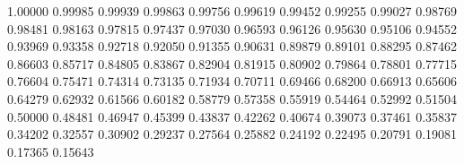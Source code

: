 	
\def\pgfmath@def#1#2#3{\expandafter\def\csname pgfmath@#1@#2\endcsname{#3}}
\pgfmath@def{cos}{0}{1.00000}		\pgfmath@def{cos}{1}{0.99985}
\pgfmath@def{cos}{2}{0.99939}		\pgfmath@def{cos}{3}{0.99863}
\pgfmath@def{cos}{4}{0.99756}		\pgfmath@def{cos}{5}{0.99619}
\pgfmath@def{cos}{6}{0.99452}		\pgfmath@def{cos}{7}{0.99255}
\pgfmath@def{cos}{8}{0.99027}		\pgfmath@def{cos}{9}{0.98769}
\pgfmath@def{cos}{10}{0.98481}		\pgfmath@def{cos}{11}{0.98163}
\pgfmath@def{cos}{12}{0.97815}		\pgfmath@def{cos}{13}{0.97437}
\pgfmath@def{cos}{14}{0.97030}		\pgfmath@def{cos}{15}{0.96593}
\pgfmath@def{cos}{16}{0.96126}		\pgfmath@def{cos}{17}{0.95630}
\pgfmath@def{cos}{18}{0.95106}		\pgfmath@def{cos}{19}{0.94552}
\pgfmath@def{cos}{20}{0.93969}		\pgfmath@def{cos}{21}{0.93358}
\pgfmath@def{cos}{22}{0.92718}		\pgfmath@def{cos}{23}{0.92050}
\pgfmath@def{cos}{24}{0.91355}		\pgfmath@def{cos}{25}{0.90631}
\pgfmath@def{cos}{26}{0.89879}		\pgfmath@def{cos}{27}{0.89101}
\pgfmath@def{cos}{28}{0.88295}		\pgfmath@def{cos}{29}{0.87462}
\pgfmath@def{cos}{30}{0.86603}		\pgfmath@def{cos}{31}{0.85717}
\pgfmath@def{cos}{32}{0.84805}		\pgfmath@def{cos}{33}{0.83867}
\pgfmath@def{cos}{34}{0.82904}		\pgfmath@def{cos}{35}{0.81915}
\pgfmath@def{cos}{36}{0.80902}		\pgfmath@def{cos}{37}{0.79864}
\pgfmath@def{cos}{38}{0.78801}		\pgfmath@def{cos}{39}{0.77715}
\pgfmath@def{cos}{40}{0.76604}		\pgfmath@def{cos}{41}{0.75471}
\pgfmath@def{cos}{42}{0.74314}		\pgfmath@def{cos}{43}{0.73135}
\pgfmath@def{cos}{44}{0.71934}		\pgfmath@def{cos}{45}{0.70711}
\pgfmath@def{cos}{46}{0.69466}		\pgfmath@def{cos}{47}{0.68200}
\pgfmath@def{cos}{48}{0.66913}		\pgfmath@def{cos}{49}{0.65606}
\pgfmath@def{cos}{50}{0.64279}		\pgfmath@def{cos}{51}{0.62932}
\pgfmath@def{cos}{52}{0.61566}		\pgfmath@def{cos}{53}{0.60182}
\pgfmath@def{cos}{54}{0.58779}		\pgfmath@def{cos}{55}{0.57358}
\pgfmath@def{cos}{56}{0.55919}		\pgfmath@def{cos}{57}{0.54464}
\pgfmath@def{cos}{58}{0.52992}		\pgfmath@def{cos}{59}{0.51504}
\pgfmath@def{cos}{60}{0.50000}		\pgfmath@def{cos}{61}{0.48481}
\pgfmath@def{cos}{62}{0.46947}		\pgfmath@def{cos}{63}{0.45399}
\pgfmath@def{cos}{64}{0.43837}		\pgfmath@def{cos}{65}{0.42262}
\pgfmath@def{cos}{66}{0.40674}		\pgfmath@def{cos}{67}{0.39073}
\pgfmath@def{cos}{68}{0.37461}		\pgfmath@def{cos}{69}{0.35837}
\pgfmath@def{cos}{70}{0.34202}		\pgfmath@def{cos}{71}{0.32557}
\pgfmath@def{cos}{72}{0.30902}		\pgfmath@def{cos}{73}{0.29237}
\pgfmath@def{cos}{74}{0.27564}		\pgfmath@def{cos}{75}{0.25882}
\pgfmath@def{cos}{76}{0.24192}		\pgfmath@def{cos}{77}{0.22495}
\pgfmath@def{cos}{78}{0.20791}		\pgfmath@def{cos}{79}{0.19081}
\pgfmath@def{cos}{80}{0.17365}		\pgfmath@def{cos}{81}{0.15643}
